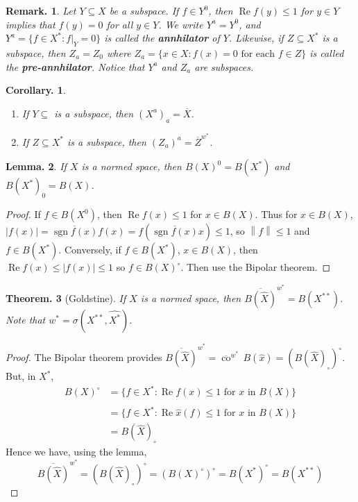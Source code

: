 \documentclass[11pt, a4paper]{memoir}
\newcommand{\norm}[1]{\ensuremath{\left\lVert#1\right\rVert}}
\theoremstyle{change}
\newtheorem{theorem}{Theorem.}[section]
\newtheorem{lemma}[theorem]{Lemma.}
\newtheorem{corollary}[theorem]{Corollary.}
\theoremstyle{plain}
\theoremstyle{nonumberplain}
\newtheorem{remark}{Remark.}
\newtheorem{proof}{Proof}
\DeclareMathOperator{\sgn}{sgn}
\renewcommand{\Re}{\ensuremath{\operatorname{Re}}}
\newcommand{\cwx}{\ensuremath{\overline{\operatorname{co}}^{w^*}\,}}
\numberwithin{equation}{section}
\begin{document}
\begin{remark}
    Let $Y\subseteq X$ be a subspace.
    If $f\in Y^0$, then $\Re f(y)\leq 1$ for $y\in Y$ implies that $f(y)=0$ for all $y\in Y$.
    We write $Y^a=Y^0$, and $Y^a=\{f\in X^*:f|_Y=0\}$ is called the \textbf{annhilator} of $Y$.
    Likewise, if $Z\subseteq X^*$ is a subspace, then $Z_a=Z_0$ where $Z_a=\{x\in X:f(x)=0\text{ for each }f\in Z\}$ is called the \textbf{pre-annhilator}.
    Notice that $Y^a$ and $Z_a$ are subspaces.
\end{remark}
\begin{corollary}
    \begin{enumerate}[nl,r]
        \item If $Y\subseteq $ is a subspace, then $(X^a)_a=\overline{X}$.
        \item If $Z\subseteq X^*$ is a subspace, then $(Z_a)^a=\overline{Z}^{w^*}$.
    \end{enumerate}
\end{corollary}
\begin{lemma}
    If $X$ is a normed space, then $B(X)^0=B(X^*)$ and $B(X^*)_0=B(X)$.
\end{lemma}
\begin{proof}
    If $f\in B(X^0)$, then $\Re f(x)\leq 1$ for $x\in B(X)$.
    Thus for $x\in B(X)$, $|f(x)|=\overline{\sgn f(x)}f(x)=f(\overline{\sgn f(x)}x)\leq 1$, so $\norm{f}\leq 1$ and $f\in B(X^*)$.
    Conversely, if $f\in B(X^*)$, $x\in B(X)$, then $\Re f(x)\leq|f(x)|\leq 1$ so $f\in B(X)^\circ$.
    Then use the Bipolar theorem.
\end{proof}
\begin{theorem}[Goldstine]
    If $X$ is a normed space, then $\overline{B(\hat X)}^{w^*}=B(X^{**})$.
    Note that $w^*=\sigma(X^{**},\hat{X^*})$.
\end{theorem}
\begin{proof}
    The Bipolar theorem provides $\overline{B(\hat X)}^{w^*}=\cwx B(\hat x)=(B(\hat X)_\circ)^\circ$.
    But, in $X^*$,
    \begin{align*}
        B(X)^\circ &= \{f\in X^*:\Re f(x)\leq 1\text{ for $x$ in }B(X)\}\\
                   &= \{f\in \hat{X^*}:\Re \hat x(f)\leq 1\text{ for $x$ in }B(X)\}\\
                   &= B(\hat X)_\circ
    \end{align*}
    Hence we have, using the lemma,
    \begin{equation*}
        \overline{B(\hat X)}^{w^*}=(B(\hat X)_\circ)^\circ=(B(X)^\circ)^\circ=B(X^*)^\circ=B(X^{**})
    \end{equation*}
\end{proof}
\end{document}
